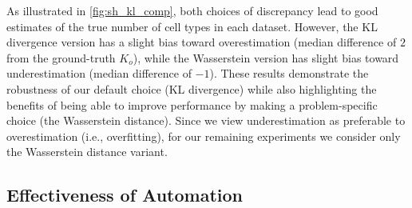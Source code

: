 %
As illustrated in \cref{fig:sh_kl_comp}, both choices of discrepancy lead to good estimates of the true number of cell types
in each dataset.
However, the KL divergence version has a slight bias toward overestimation (median difference of $2$ from the ground-truth $K_o$),
while the Wasserstein version has slight bias toward underestimation (median difference of $-1$).
These results demonstrate the robustness of our default choice (KL divergence) while also highlighting the benefits of being able to improve performance by making a problem-specific choice (the Wasserstein distance).
Since we view underestimation as preferable to overestimation (i.e., overfitting),
for our remaining experiments we consider only the Wasserstein distance variant.



\subsection{Effectiveness of Automation}

